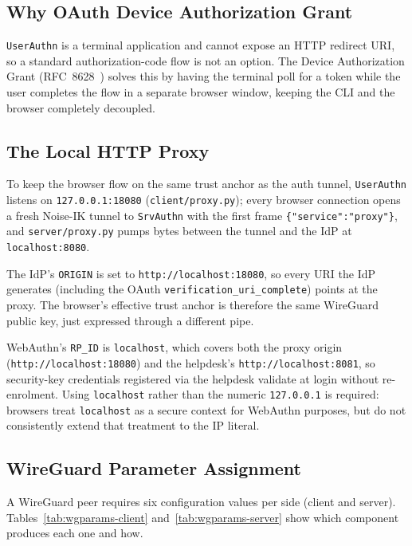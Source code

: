 \subsection{Why OAuth Device Authorization Grant}
\texttt{UserAuthn} is a terminal application and cannot expose an HTTP
redirect URI, so a standard authorization-code flow is not an option.
The Device Authorization Grant (RFC~8628~\cite{rfc8628}) solves this by
having the terminal poll for a token while the user completes the flow in
a separate browser window, keeping the CLI and the browser completely
decoupled.

\subsection{The Local HTTP Proxy}
\label{sec:proxy}
To keep the browser flow on the same trust anchor as the auth tunnel,
\texttt{UserAuthn} listens on \texttt{127.0.0.1:18080}
(\texttt{client/proxy.py}); every browser connection opens a fresh Noise-IK
tunnel to \texttt{SrvAuthn} with the first frame
\texttt{\{"service":"proxy"\}}, and \texttt{server/proxy.py} pumps bytes
between the tunnel and the IdP at \texttt{localhost:8080}.

The IdP's \texttt{ORIGIN} is set to \texttt{http://localhost:18080}, so
every URI the IdP generates (including the OAuth
\texttt{verification\_uri\_complete}) points at the proxy.
The browser's effective trust anchor is therefore the same WireGuard
public key, just expressed through a different pipe.

WebAuthn's \texttt{RP\_ID} is \texttt{localhost}, which covers both the
proxy origin (\texttt{http://localhost:18080}) and the helpdesk's
\texttt{http://localhost:8081}, so security-key credentials registered
via the helpdesk validate at login without re-enrolment.
Using \texttt{localhost} rather than the numeric \texttt{127.0.0.1} is
required: browsers treat \texttt{localhost} as a secure context for
WebAuthn purposes, but do not consistently extend that treatment to
the IP literal.

\subsection{WireGuard Parameter Assignment}
\label{sec:wgparams}
A WireGuard peer requires six configuration values per side (client and
server).
Tables~\ref{tab:wgparams-client} and~\ref{tab:wgparams-server} show which component produces each one and how.

